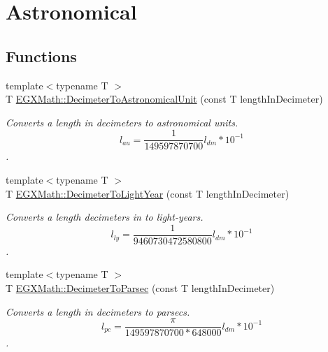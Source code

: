 \hypertarget{group___e_g_x_math-_conversions-_length_conversions-_s_i-_decimeter-_astronomical}{}\section{Astronomical}
\label{group___e_g_x_math-_conversions-_length_conversions-_s_i-_decimeter-_astronomical}
\subsection*{Functions}
\begin{DoxyCompactItemize}
\item 
{\footnotesize template$<$typename T $>$ }\\T \mbox{\hyperlink{group___e_g_x_math-_conversions-_length_conversions-_s_i-_decimeter-_astronomical_ga9cf39545f022d3a541668e644347b2f8}{E\+G\+X\+Math\+::\+Decimeter\+To\+Astronomical\+Unit}} (const T length\+In\+Decimeter)
\begin{DoxyCompactList}\small\item\em Converts a length in decimeters to astronomical units. \[ l_{au}= \frac{1}{149597870700} l_{dm} * 10^{-1} \]. \end{DoxyCompactList}\item 
{\footnotesize template$<$typename T $>$ }\\T \mbox{\hyperlink{group___e_g_x_math-_conversions-_length_conversions-_s_i-_decimeter-_astronomical_ga2dedea5304a0dbcba4efa1128eda42d2}{E\+G\+X\+Math\+::\+Decimeter\+To\+Light\+Year}} (const T length\+In\+Decimeter)
\begin{DoxyCompactList}\small\item\em Converts a length decimeters in to light-\/years. \[ l_{ly}= \frac{1}{9460730472580800} l_{dm} * 10^{-1} \]. \end{DoxyCompactList}\item 
{\footnotesize template$<$typename T $>$ }\\T \mbox{\hyperlink{group___e_g_x_math-_conversions-_length_conversions-_s_i-_decimeter-_astronomical_gad84954082a6648312ce4fc52d1e4d8eb}{E\+G\+X\+Math\+::\+Decimeter\+To\+Parsec}} (const T length\+In\+Decimeter)
\begin{DoxyCompactList}\small\item\em Converts a length in decimeters to parsecs. \[ l_{pc}=\frac{\pi}{149597870700 * 648000} l_{dm} * 10^{-1} \]. \end{DoxyCompactList}\end{DoxyCompactItemize}


